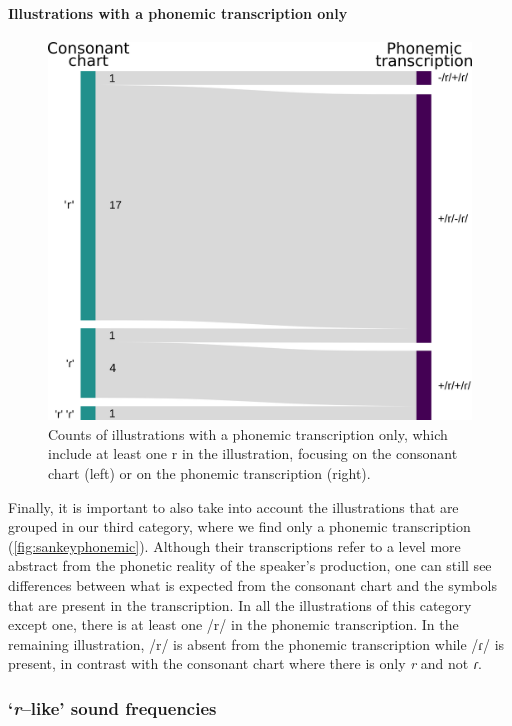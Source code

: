 \paragraph{Illustrations with a phonemic transcription only}

\begin{figure}
	\centering
	\includegraphics[width=0.75\linewidth]{jipa/images/sankey_phonemic}
	\caption[Counts of illustrations with a phonemic transcription only, which include at least one r in the illustration]{Counts of illustrations with a phonemic transcription only, which include at least one r in the illustration, focusing on the consonant chart (left) or on the phonemic transcription (right).}
	\label{fig:sankeyphonemic}
\end{figure}

Finally, it is important to also take into account the illustrations that are grouped in our third category, where we find only a phonemic transcription (\autoref{fig:sankeyphonemic}). Although their transcriptions refer to a level more abstract from the phonetic reality of the speaker’s production, one can still see differences between what is expected from the consonant chart and the symbols that are present in the transcription. In all the illustrations of this category except one, there is at least one /r/ in the phonemic transcription. In the remaining illustration, /r/ is absent from the phonemic transcription while /ɾ/ is present, in contrast with the consonant chart where there is only \textit{r} and not \textit{ɾ}.

\subsubsection{‘\textit{r}–like’ sound frequencies}

